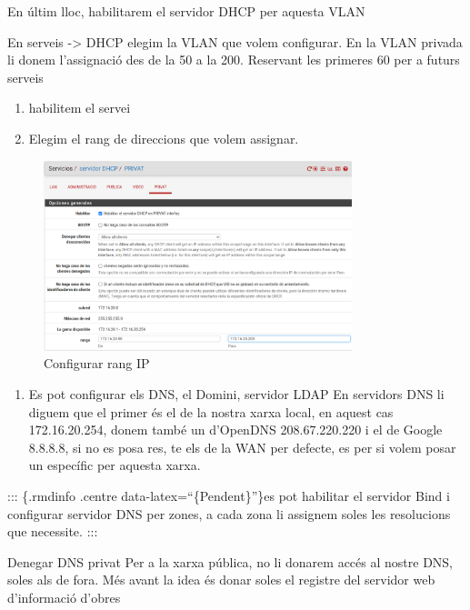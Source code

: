 \documentclass[
  10pt,
]{krantz}
\providecommand{\tightlist}{%
  \setlength{\itemsep}{0pt}\setlength{\parskip}{0pt}}
\begin{document}
En últim lloc, habilitarem el servidor DHCP per aquesta VLAN

En serveis -\textgreater{} DHCP elegim la VLAN que volem configurar. En la VLAN privada li donem l'assignació des de la 50 a la 200. Reservant les primeres 60 per a futurs serveis

\begin{enumerate}
\def\labelenumi{\arabic{enumi}.}
\tightlist
\item
  habilitem el servei
\item
  Elegim el rang de direccions que volem assignar.
\end{enumerate}

\begin{figure}
\centering
\includegraphics[width=0.8\textwidth,height=\textheight]{imatges/proxmox/config_rang.png}
\caption{Configurar rang IP}
\end{figure}

\begin{enumerate}
\def\labelenumi{\arabic{enumi}.}
\setcounter{enumi}{2}
\tightlist
\item
  Es pot configurar els DNS, el Domini, servidor LDAP En servidors DNS li diguem que el primer és el de la nostra xarxa local, en aquest cas 172.16.20.254, donem també un d'OpenDNS 208.67.220.220 i el de Google 8.8.8.8, si no es posa res, te els de la WAN per defecte, es per si volem posar un específic per aquesta xarxa.
\end{enumerate}

::: \{.rmdinfo .centre data-latex=``\{Pendent\}''\}es pot habilitar el servidor Bind i configurar servidor DNS per zones, a cada zona li assignem soles les resolucions que necessite. :::

\begin{rmdcuidao}{Denegar DNS privat}
Per a la xarxa pública, no li donarem accés al nostre DNS, soles als de fora. Més avant la idea és donar soles el registre del servidor web d'informació d'obres

\end{rmdcuidao}
\end{document}
